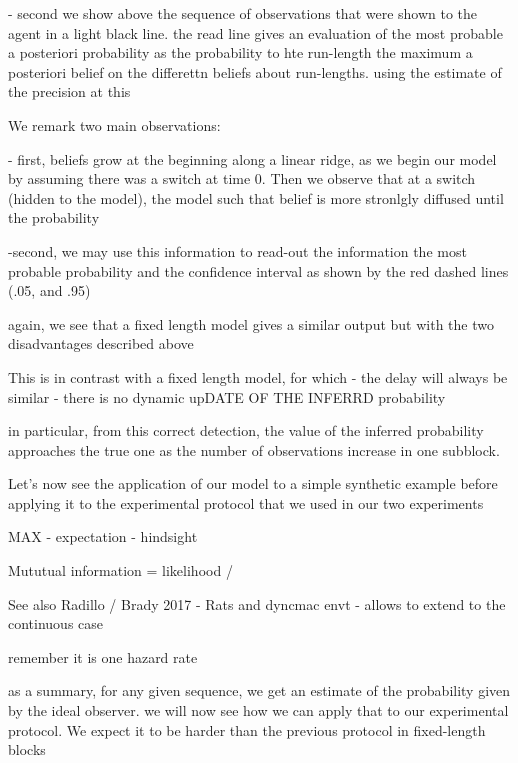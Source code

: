 \documentclass[profile,final,english, draft]{article}%
\begin{document}
- second we show above the sequence of observations that were shown to the agent in a light black line. the read line gives an evaluation of the most probable a posteriori probability as the probability to hte run-length the maximum a posteriori belief on the differettn beliefs about run-lengths. using the estimate of the precision at this

We remark two main observations:

- first, beliefs grow at the beginning along a linear ridge, as we begin our model by assuming there was a switch at time 0. Then we observe that at a switch (hidden to the model), the model
such that belief is more stronlgly diffused until the probability

-second, we may use this information to read-out the information the most probable probability and the confidence interval as shown by the red dashed lines (.05, and .95)

again, we see that a fixed length model gives a similar output
but with the two disadvantages described above

This is in contrast with a fixed length model, for which
- the delay will always be similar
- there is no dynamic upDATE OF THE INFERRD probability


in particular, from this correct detection,
the value of the inferred probability approaches
the true one as the number of observations increase in one subblock.


Let's now see the application of our model to a simple synthetic example before applying it to the experimental protocol that we used in our two experiments

MAX - expectation - hindsight

Mututual information = likelihood / 




See also Radillo / Brady 2017 - Rats and dyncmac envt - allows to extend to the continuous case


remember it is one hazard rate

as a summary, for any given sequence,
 we get an estimate of the probability given by the ideal observer.
 we will now see how we can apply that to our experimental protocol.
 We expect it to be harder than the previous protocol
 in fixed-length blocks

\end{document}
